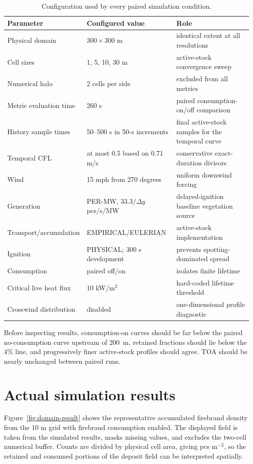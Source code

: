 \begin{table}[htbp]
\centering
\small
\begin{tabular}{p{}p{}p{}}
\toprule
Parameter & Configured value & Role \\
\midrule
Physical domain & $300\times300$ m & identical extent at all resolutions \\
Cell sizes & 1, 5, 10, 30 m & active-stock convergence sweep \\
Numerical halo & 2 cells per side & excluded from all metrics \\
Metric evaluation time & 260 s & paired consumption-on/off comparison \\
History sample times & 50--500 s in 50-s increments & final active-stock samples for the temporal curve \\
Temporal CFL & at most 0.5 based on 0.71 m/s & conservative exact-duration divisors \\
Wind & 15 mph from 270 degrees & uniform downwind forcing \\
Generation & PER-MW, $33.3/\Delta y$ pcs/s/MW & delayed-ignition baseline vegetation source \\
Transport/accumulation & EMPIRICAL/EULERIAN & active-stock implementation \\
Ignition & PHYSICAL; 300 s development & prevents spotting-dominated spread \\
Consumption & paired off/on & isolates finite lifetime \\
Critical live heat flux & 10 kW/m$^2$ & hard-coded lifetime threshold \\
Crosswind distribution & disabled & one-dimensional profile diagnostic \\
\bottomrule
\end{tabular}
\caption{Configuration used by every paired simulation condition.}
\end{table}

Before inspecting results, consumption-on curves should be far below the paired
no-consumption curve upstream of 200~m, retained fractions should lie below the
4\% line, and progressively finer active-stock profiles should agree. TOA
should be nearly unchanged between paired runs.

\section{Actual simulation results}

Figure~\ref{fig:domain-result} shows the representative accumulated firebrand density from the 10 m grid with firebrand consumption enabled.
The displayed field is taken from the simulated results, masks missing values, and excludes
the two-cell numerical buffer.  Counts are divided by physical cell area, giving pcs m$^{-2}$, so the retained and consumed portions of the deposit field can be interpreted spatially.

